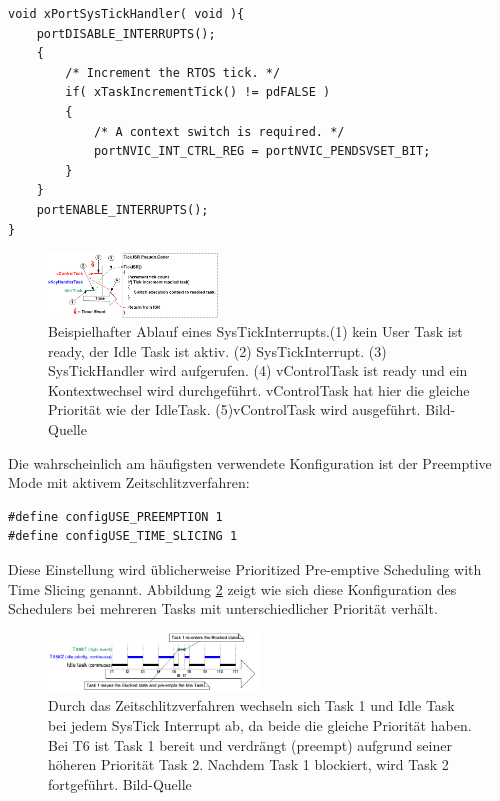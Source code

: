 \begin{lstlisting}[caption={FreeRTOS Source des SysTickHandlers aus Task.c. Der SysTickHandler verwaltet den TickCount. Der TickCount dient allen Timingfunktionen des RTOS Kernels als Zeitreferenz. Des Weiteren wird beim aktiven Time Slicing überprüft, ob ein Kontextwechsel nötig ist. Der Kontextwechsel wird dann ggf. durch den PendSVHandler durchgeführt.}, linewidth=8cm,captionpos=b, label=lst:SysTickS, float=hbt]
void xPortSysTickHandler( void ){
	portDISABLE_INTERRUPTS();
	{
		/* Increment the RTOS tick. */
		if( xTaskIncrementTick() != pdFALSE )
		{
			/* A context switch is required. */
			portNVIC_INT_CTRL_REG = portNVIC_PENDSVSET_BIT;
		}
	}
	portENABLE_INTERRUPTS();
}
\end{lstlisting}
\begin{figure}[htb]
	\centering
		\includegraphics[width=0.4\textwidth]{Pictures/FreeRTOSOrg/TickISR.png}
	\caption{Beispielhafter Ablauf eines SysTickInterrupts.(1) kein User Task ist ready, der Idle Task ist aktiv. (2) SysTickInterrupt. (3) SysTickHandler wird aufgerufen. (4) vControlTask ist ready und ein Kontextwechsel wird durchgeführt. vControlTask hat hier die gleiche Priorität wie der IdleTask. (5)vControlTask wird ausgeführt. Bild-Quelle~\protect{}}
	\label{fig:SysTick}
\end{figure}
Die wahrscheinlich am häufigsten verwendete Konfiguration ist der Preemptive Mode mit aktivem Zeitschlitzverfahren:
\begin{lstlisting}[numbers = none]
#define configUSE_PREEMPTION 1
#define configUSE_TIME_SLICING 1
\end{lstlisting}
Diese Einstellung wird üblicherweise Prioritized Pre-emptive Scheduling with Time Slicing genannt. Abbildung \ref{fig:timeslice} zeigt wie sich diese Konfiguration des Schedulers bei mehreren Tasks mit unterschiedlicher Priorität verhält.
\begin{figure}[htb]
	\centering
		\includegraphics[width=0.5\textwidth]{Pictures/Scheduling/timeslice2.png}
	\caption{Durch das Zeitschlitzverfahren wechseln sich Task 1 und Idle Task bei jedem SysTick Interrupt ab, da beide die gleiche Priorität haben. Bei T6 ist Task 1 bereit und verdrängt (preempt) aufgrund seiner höheren Priorität Task 2. Nachdem Task 1 blockiert, wird Task 2 fortgeführt. Bild-Quelle~\protect{}}
	\label{fig:timeslice}
\end{figure}
